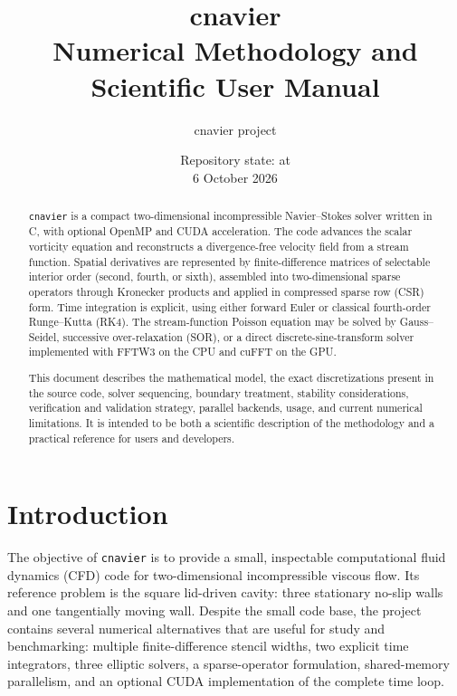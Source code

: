 \documentclass[11pt,a4paper]{article}
\title{\textbf{cnavier}\\[0.5em]
\large Numerical Methodology and Scientific User Manual}
\author{cnavier project}
\date{Repository state: \code{main} at \code{5018e29bff534b252a7ac9025ece4ac43efd78ad}\\6 October 2026}
\begin{document}
\maketitle

\begin{abstract}
\texttt{cnavier} is a compact two-dimensional incompressible Navier--Stokes solver written in C, with optional OpenMP and CUDA acceleration.  The code advances the scalar vorticity equation and reconstructs a divergence-free velocity field from a stream function.  Spatial derivatives are represented by finite-difference matrices of selectable interior order (second, fourth, or sixth), assembled into two-dimensional sparse operators through Kronecker products and applied in compressed sparse row (CSR) form.  Time integration is explicit, using either forward Euler or classical fourth-order Runge--Kutta (RK4).  The stream-function Poisson equation may be solved by Gauss--Seidel, successive over-relaxation (SOR), or a direct discrete-sine-transform solver implemented with FFTW3 on the CPU and cuFFT on the GPU.

This document describes the mathematical model, the exact discretizations present in the source code, solver sequencing, boundary treatment, stability considerations, verification and validation strategy, parallel backends, usage, and current numerical limitations.  It is intended to be both a scientific description of the methodology and a practical reference for users and developers.
\end{abstract}

\tableofcontents
\newpage

\section{Introduction}

The objective of \texttt{cnavier} is to provide a small, inspectable computational fluid dynamics (CFD) code for two-dimensional incompressible viscous flow.  Its reference problem is the square lid-driven cavity: three stationary no-slip walls and one tangentially moving wall.  Despite the small code base, the project contains several numerical alternatives that are useful for study and benchmarking: multiple finite-difference stencil widths, two explicit time integrators, three elliptic solvers, a sparse-operator formulation, shared-memory parallelism, and an optional CUDA implementation of the complete time loop.
\end{document}
